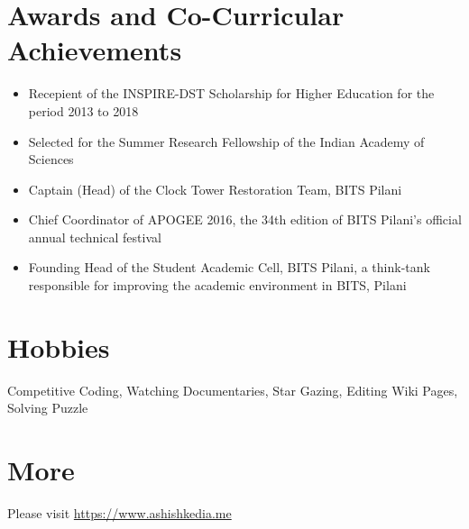 \documentclass[margin, centered]{res}
\begin{document}
\begin{resume}




\section{Awards and Co-Curricular Achievements}
\begin{itemize}[leftmargin=*]
 \item Recepient of the INSPIRE-DST Scholarship for Higher Education for the period 2013 to 2018
 \item Selected for the Summer Research Fellowship of the Indian Academy of Sciences
 \item Captain (Head) of the Clock Tower Restoration Team, BITS Pilani
 \item Chief Coordinator of APOGEE 2016, the 34th edition of BITS Pilani's official annual technical festival
 \item Founding Head of the Student Academic Cell, BITS Pilani, a think-tank responsible for improving the academic environment in BITS, Pilani
\end{itemize}


\section{Hobbies}
Competitive Coding, Watching Documentaries, Star Gazing, Editing Wiki Pages, Solving Puzzle

\section{More}
Please visit \href{https://www.ashishkedia.me}{https://www.ashishkedia.me}

\end{resume}
\end{document}
